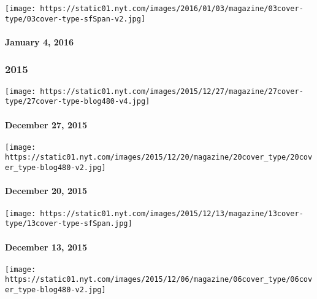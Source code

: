 \href{http://www.nytimes.com/indexes/2016/01/04/magazine/index.html}{}

\texttt{[image: https://static01.nyt.com/images/2016/01/03/magazine/03cover-type/03cover-type-sfSpan-v2.jpg]}

\hypertarget{january-4-2016}{%
\paragraph{January 4, 2016}\label{january-4-2016}}

\hypertarget{2015}{%
\subsubsection{2015}\label{2015}}

\href{http://www.nytimes.com/indexes/2015/12/27/magazine/index.html}{}

\texttt{[image: https://static01.nyt.com/images/2015/12/27/magazine/27cover-type/27cover-type-blog480-v4.jpg]}

\hypertarget{december-27-2015}{%
\paragraph{December 27, 2015}\label{december-27-2015}}

\href{http://www.nytimes.com/indexes/2015/12/20/magazine/index.html}{}

\texttt{[image: https://static01.nyt.com/images/2015/12/20/magazine/20cover\_type/20cover\_type-blog480-v2.jpg]}

\hypertarget{december-20-2015}{%
\paragraph{December 20, 2015}\label{december-20-2015}}

\href{http://www.nytimes.com/indexes/2015/12/13/magazine/index.html}{}

\texttt{[image: https://static01.nyt.com/images/2015/12/13/magazine/13cover-type/13cover-type-sfSpan.jpg]}

\hypertarget{december-13-2015}{%
\paragraph{December 13, 2015}\label{december-13-2015}}

\href{http://www.nytimes.com/indexes/2015/12/06/magazine/index.html}{}

\texttt{[image: https://static01.nyt.com/images/2015/12/06/magazine/06cover\_type/06cover\_type-blog480-v2.jpg]}

